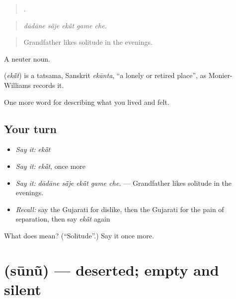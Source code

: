 \begin{quote}
    .
\end{quote}

\begin{quote}
\emph{dādāne sā̃je ekā̃t game che.}
\end{quote}

\begin{quote}
Grandfather likes solitude in the evenings.
\end{quote}

A neuter noun.

\begin{cousinweb}
\textbf{} (\emph{ekā̃t}) is a tatsama, Sanskrit \emph{ekānta}, \textquotedblleft{}a lonely or retired place\textquotedblright{}, as Monier-Williams records it.
\end{cousinweb}

\begin{grammarlens}[title={What you've built}]
One more word for describing what you lived and felt.
\end{grammarlens}

\subsection*{Your turn}
\begin{itemize}
\raggedright
  \item \emph{Say it:} \emph{ekā̃t}
  \item \emph{Say it:} \emph{ekā̃t}, once more
  \item \emph{Say it:} \emph{dādāne sā̃je ekā̃t game che.} — Grandfather likes solitude in the evenings.
  \item \emph{Recall:} say the Gujarati for dislike, then the Gujarati for the pain of separation, then say \emph{ekā̃t} again
\end{itemize}

\begin{tcolorbox}[breakable,colback=teal!4,colframe=teal!35!black,title={Before you move on}]
What does  mean? (\textquotedblleft{}Solitude\textquotedblright{}.) Say it once more.
\end{tcolorbox}
\section[\texorpdfstring{\gu{સૂનું} (sūnũ)}{સૂનું (sūnũ)}]{ (sūnũ) — deserted; empty and silent}

